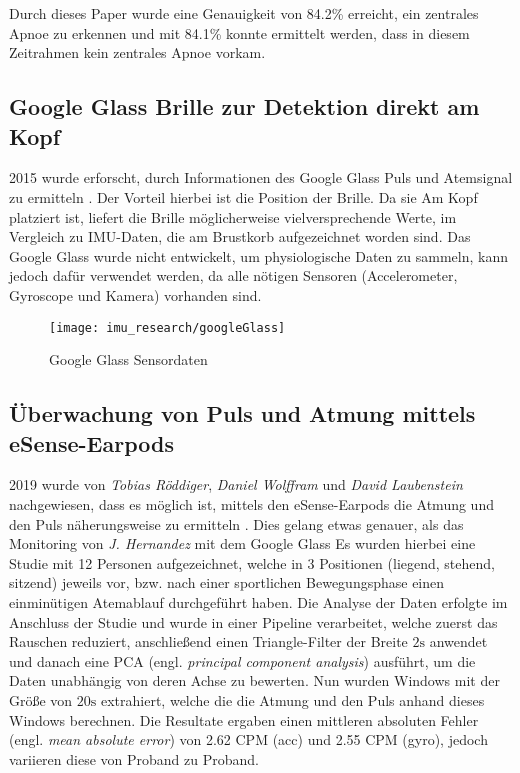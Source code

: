 Durch dieses Paper wurde eine Genauigkeit von 84.2\% erreicht, ein zentrales Apnoe zu erkennen und mit 84.1\% konnte ermittelt werden, dass in diesem Zeitrahmen kein zentrales Apnoe vorkam.


\subsection{Google Glass Brille zur Detektion direkt am Kopf}
2015 wurde erforscht, durch Informationen des Google Glass Puls und Atemsignal zu ermitteln \cite{hernandez_cardiac_nodate}. 
Der Vorteil hierbei ist die Position der Brille. 
Da sie Am Kopf platziert ist, liefert die Brille möglicherweise vielversprechende Werte, im Vergleich zu IMU-Daten, die am Brustkorb aufgezeichnet worden sind.
Das Google Glass wurde nicht entwickelt, um physiologische Daten zu sammeln, kann jedoch dafür verwendet werden, da alle nötigen Sensoren (Accelerometer, Gyroscope und Kamera) vorhanden sind.

\begin{figure}[ht]
    \centering
    \texttt{[image: imu\_research/googleGlass]}
    \caption{Google Glass Sensordaten \cite{hernandez_cardiac_nodate}}
    \label{imu_research_google_glass}
\end{figure}

\subsection{Überwachung von Puls und Atmung mittels eSense-Earpods}
2019 wurde von \textit{Tobias Röddiger}, \textit{Daniel Wolffram} und \textit{David Laubenstein} nachgewiesen, dass es möglich ist, mittels den eSense-Earpods die Atmung und den Puls näherungsweise zu ermitteln \cite{roddiger_towards_2019}. 
Dies gelang etwas genauer, als das Monitoring von \textit{J. Hernandez} mit dem Google Glass \cite{hernandez_cardiac_nodate}
Es wurden hierbei eine Studie mit 12 Personen aufgezeichnet, welche in 3 Positionen (liegend, stehend, sitzend) jeweils vor, bzw. nach einer sportlichen Bewegungsphase einen einminütigen Atemablauf durchgeführt haben. 
Die Analyse der Daten erfolgte im Anschluss der Studie und wurde in einer Pipeline verarbeitet, welche zuerst das Rauschen reduziert, anschließend einen Triangle-Filter der Breite $2\si{\s}$ anwendet und danach eine PCA (engl. \textit{principal component analysis}) ausführt, um die Daten unabhängig von deren Achse zu bewerten.
Nun wurden Windows mit der Größe von $20\si{\s}$ extrahiert, welche die die Atmung und den Puls anhand dieses Windows berechnen.
Die Resultate ergaben einen mittleren absoluten Fehler (engl. \textit{mean absolute error}) von 2.62 CPM (acc) und 2.55 CPM (gyro), jedoch variieren diese von Proband zu Proband.